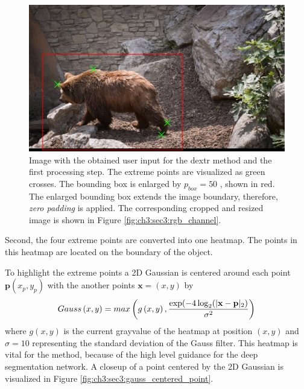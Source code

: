 \begin{figure}
	\includegraphics[width=\linewidth]{figures/chap33_bear_bbox.png}
	\caption[DEXTR User Interaction]{		
		Image with the obtained user input for the \gls{dextr} method and the first processing step.
		The extreme points are visualized as green crosses.
		The bounding box is enlarged by $p_{{box}} = 50$ , shown in red.
		The enlarged bounding box extends the image boundary, therefore, \textit{zero padding} is applied.
		The corresponding cropped and resized image is shown in Figure \ref{fig:ch3:sec3:rgb_channel}.
	}
	\label{fig:ch3:sec3:user_interaction}
\end{figure}


Second, the four extreme points are converted into one heatmap.
The points in this heatmap are located on the boundary of the object.

To highlight the extreme points a 2D Gaussian is centered around each point $ \textbf{p} (x_p, y_p) $ with the another points $ \mathbf{x} = (x, y) $ by
\begin{equation} \label{equ:gauss}
	\centering
	Gauss \left( x,y \right)  = max \left( g\left( x,y\right) , \frac{\exp(- 4 \log_{2}(| \textbf{x} - \textbf{p} |_2)}{\sigma^{2}}\right) 
\end{equation}
where $ g (x,y) $ is the current grayvalue of the heatmap at position $ (x, y) $ and $ \sigma = 10 $ representing the standard deviation of the Gauss filter.
This heatmap is vital for the method, because of the high level guidance for the deep segmentation network.
A closeup of a point centered by the 2D Gaussian is visualized in Figure \ref{fig:ch3:sec3:gauss_centered_point}.

